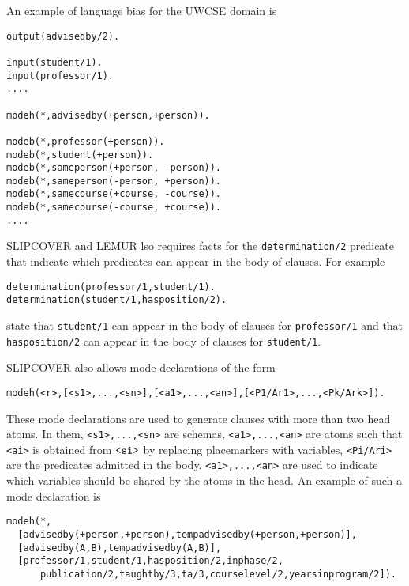 \documentclass[a4paper,10pt]{scrartcl}
\begin{document}
An example of language bias for the UWCSE domain is
\begin{verbatim}
output(advisedby/2).

input(student/1).
input(professor/1).
....

modeh(*,advisedby(+person,+person)). 

modeb(*,professor(+person)).
modeb(*,student(+person)).
modeb(*,sameperson(+person, -person)). 
modeb(*,sameperson(-person, +person)). 
modeb(*,samecourse(+course, -course)). 
modeb(*,samecourse(-course, +course)). 
....
\end{verbatim}
SLIPCOVER and LEMUR lso requires facts for the \verb|determination/2| predicate that indicate which predicates can appear in the body of clauses. 
For example
\begin{verbatim}
determination(professor/1,student/1).
determination(student/1,hasposition/2).
\end{verbatim}
state that \verb|student/1| can appear in the body of clauses for \verb|professor/1| and that \verb|hasposition/2| can appear in 
the body of clauses for \verb|student/1|.

SLIPCOVER also allows mode declarations of the form
\begin{verbatim}
modeh(<r>,[<s1>,...,<sn>],[<a1>,...,<an>],[<P1/Ar1>,...,<Pk/Ark>]). 
\end{verbatim}
These mode declarations are used to generate clauses with more than two head atoms. In them, \verb|<s1>,...,<sn>| are schemas,  \verb|<a1>,...,<an>| are atoms such that \verb|<ai>| is obtained from $\verb|<si>|$ by replacing placemarkers with variables, 
\verb|<Pi/Ari>| are the predicates admitted in the body. \verb|<a1>,...,<an>| are used to indicate which variables should be shared by the atoms in the head.
An example of such a mode declaration is
\begin{verbatim}
modeh(*,
  [advisedby(+person,+person),tempadvisedby(+person,+person)],
  [advisedby(A,B),tempadvisedby(A,B)],
  [professor/1,student/1,hasposition/2,inphase/2,
	  publication/2,taughtby/3,ta/3,courselevel/2,yearsinprogram/2]).
\end{verbatim}
\end{document}
